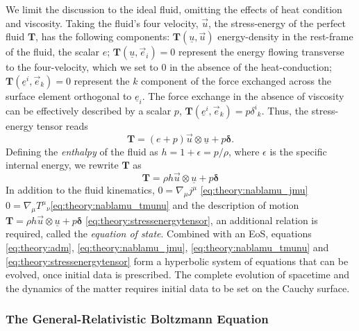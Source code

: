 We limit the discussion to the ideal fluid, omitting the effects of heat condition and viscosity.
Taking the fluid's four velocity, $\vec{u}$, the stress-energy of the perfect fluid $\boldsymbol{T}$, has the following components:
$\boldsymbol{T}(\underline{u}, \vec{u})$ energy-density in the rest-frame of the fluid, the scalar $e$;
$\boldsymbol{T}(\underline{u}, \vec{e}_i) = 0$ represent the energy flowing transverse to the four-velocity, which we set to $0$ in the absence of the heat-conduction;
$\boldsymbol{T}(\underline{e}^i, \vec{e}_k) = 0$ represent the $k$ component of the force exchanged across the surface element orthogonal to $\underline{e}_i$.
The force exchange in the absence of viscosity can be effectively described by a scalar $p$, 
$\boldsymbol{T}(\underline{e}^i,\vec{e}_k) = p {\delta^i}_k$.
Thus, the stress-energy tensor reads
\begin{equation}
\boldsymbol{T} = (e + p)\vec{u}\otimes \underline{u} + p\boldsymbol{\delta}.
\end{equation}
Defining the \textit{enthalpy} of the fluid as $h = 1 + \epsilon = p/\rho$, where $\epsilon$ is the specific internal energy, we rewrite $\boldsymbol{T}$ as 
\begin{equation}
\boldsymbol{T} = \rho h \vec{u}\otimes\underline{u} + p\boldsymbol{\delta}
\end{equation}
In addition to the fluid kinematics,
$0 = \nabla_{\mu} j^{\mu}$ \ref{eq:theory:nablamu_jmu}
$0 = \nabla_{\mu}{T^{\mu}}_{\nu}$\ref{eq:theory:nablamu_tmunu}
and the description of motion
$\boldsymbol{T} = \rho h \vec{u}\otimes\underline{u} + p\boldsymbol{\delta}$ \ref{eq:theory:stressenergytensor},
an additional relation is required, called the \textit{equation of state}.
Combined with an EoS, equations \ref{eq:theory:adm}, \ref{eq:theory:nablamu_jmu}, \ref{eq:theory:nablamu_tmunu} and \ref{eq:theory:stressenergytensor} form a hyperbolic
system of equations that can be evolved, once initial data is prescribed. 
The complete evolution of spacetime and the dynamics of the matter requires initial data to be set on the Cauchy surface.



\subsubsection{The General-Relativistic Boltzmann Equation}

